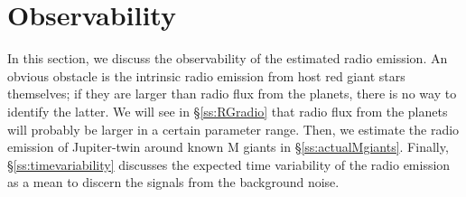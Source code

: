 \documentclass{emulateapj}
\def\plotonesc#1{\centering \leavevmode
\texttt{[image: \#1]}}
\begin{document}

\section{Observability}
\label{s:observability}

In this section, we discuss the observability of the estimated radio emission. 
An obvious obstacle is the intrinsic radio emission from host red giant stars themselves; if they are larger than radio flux from the planets, there is no way to identify the latter. We will see in \S\ref{ss:RGradio} that radio flux from the planets will probably be larger in a certain parameter range. 
Then, we estimate the radio emission of Jupiter-twin around known M giants in \S\ref{ss:actualMgiants}. 
Finally, \S\ref{ss:timevariability} discusses the expected time variability of the radio emission as a mean to discern the signals from the background noise. 
\end{document}
